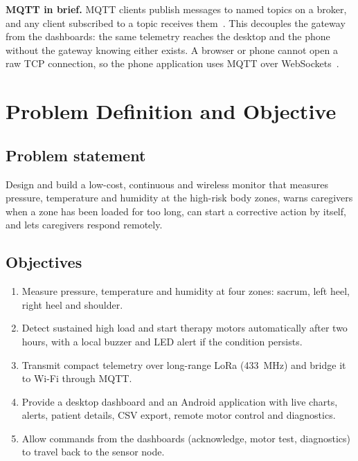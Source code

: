 \textbf{MQTT in brief.} MQTT clients publish messages to named topics on a broker, and any client subscribed to a topic receives them~\cite{oasis_mqtt}. This decouples the gateway from the dashboards: the same telemetry reaches the desktop and the phone without the gateway knowing either exists. A browser or phone cannot open a raw TCP connection, so the phone application uses MQTT over WebSockets~\cite{mqttjs}.

\clearpage
\section{Problem Definition and Objective}
\label{sec:problem}

\subsection{Problem statement}
Design and build a low-cost, continuous and wireless monitor that measures pressure, temperature and humidity at the high-risk body zones, warns caregivers when a zone has been loaded for too long, can start a corrective action by itself, and lets caregivers respond remotely.

\subsection{Objectives}
\begin{enumerate}
\item Measure pressure, temperature and humidity at four zones: sacrum, left heel, right heel and shoulder.
\item Detect sustained high load and start therapy motors automatically after two hours, with a local buzzer and LED alert if the condition persists.
\item Transmit compact telemetry over long-range LoRa (433~MHz) and bridge it to Wi-Fi through MQTT.
\item Provide a desktop dashboard and an Android application with live charts, alerts, patient details, CSV export, remote motor control and diagnostics.
\item Allow commands from the dashboards (acknowledge, motor test, diagnostics) to travel back to the sensor node.
\end{enumerate}

